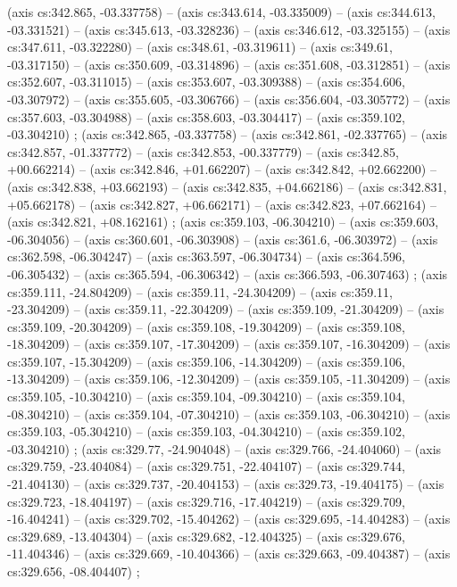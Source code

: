     (axis cs:342.865,    -03.337758) --  (axis cs:343.614,    -03.335009) --  (axis cs:344.613,    -03.331521) --  (axis cs:345.613,    -03.328236) --  (axis cs:346.612,    -03.325155) --  (axis cs:347.611,    -03.322280) --  (axis cs:348.61,    -03.319611) --  (axis cs:349.61,    -03.317150) --  (axis cs:350.609,    -03.314896) --  (axis cs:351.608,    -03.312851) --  (axis cs:352.607,    -03.311015) --  (axis cs:353.607,    -03.309388) --  (axis cs:354.606,    -03.307972) --  (axis cs:355.605,    -03.306766) --  (axis cs:356.604,    -03.305772) --  (axis cs:357.603,    -03.304988) --  (axis cs:358.603,    -03.304417) --  (axis cs:359.102,    -03.304210) ;
    (axis cs:342.865,    -03.337758) --  (axis cs:342.861,    -02.337765) --  (axis cs:342.857,    -01.337772) --  (axis cs:342.853,    -00.337779) --  (axis cs:342.85,    +00.662214) --  (axis cs:342.846,    +01.662207) --  (axis cs:342.842,    +02.662200) --  (axis cs:342.838,    +03.662193) --  (axis cs:342.835,    +04.662186) --  (axis cs:342.831,    +05.662178) --  (axis cs:342.827,    +06.662171) --  (axis cs:342.823,    +07.662164) --  (axis cs:342.821,    +08.162161) ;
    (axis cs:359.103,    -06.304210) --  (axis cs:359.603,    -06.304056) --  (axis cs:360.601,    -06.303908) --  (axis cs:361.6,    -06.303972) --  (axis cs:362.598,    -06.304247) --  (axis cs:363.597,    -06.304734) --  (axis cs:364.596,    -06.305432) --  (axis cs:365.594,    -06.306342) --  (axis cs:366.593,    -06.307463) ;
    (axis cs:359.111,    -24.804209) --  (axis cs:359.11,    -24.304209) --  (axis cs:359.11,    -23.304209) --  (axis cs:359.11,    -22.304209) --  (axis cs:359.109,    -21.304209) --  (axis cs:359.109,    -20.304209) --  (axis cs:359.108,    -19.304209) --  (axis cs:359.108,    -18.304209) --  (axis cs:359.107,    -17.304209) --  (axis cs:359.107,    -16.304209) --  (axis cs:359.107,    -15.304209) --  (axis cs:359.106,    -14.304209) --  (axis cs:359.106,    -13.304209) --  (axis cs:359.106,    -12.304209) --  (axis cs:359.105,    -11.304209) --  (axis cs:359.105,    -10.304210) --  (axis cs:359.104,    -09.304210) --  (axis cs:359.104,    -08.304210) --  (axis cs:359.104,    -07.304210) --  (axis cs:359.103,    -06.304210) --  (axis cs:359.103,    -05.304210) --  (axis cs:359.103,    -04.304210) --  (axis cs:359.102,    -03.304210) ;
    (axis cs:329.77,    -24.904048) --  (axis cs:329.766,    -24.404060) --  (axis cs:329.759,    -23.404084) --  (axis cs:329.751,    -22.404107) --  (axis cs:329.744,    -21.404130) --  (axis cs:329.737,    -20.404153) --  (axis cs:329.73,    -19.404175) --  (axis cs:329.723,    -18.404197) --  (axis cs:329.716,    -17.404219) --  (axis cs:329.709,    -16.404241) --  (axis cs:329.702,    -15.404262) --  (axis cs:329.695,    -14.404283) --  (axis cs:329.689,    -13.404304) --  (axis cs:329.682,    -12.404325) --  (axis cs:329.676,    -11.404346) --  (axis cs:329.669,    -10.404366) --  (axis cs:329.663,    -09.404387) --  (axis cs:329.656,    -08.404407) ;
